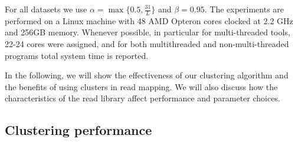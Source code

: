 \documentclass[a4paper]{article}
\begin{document}
For all datasets we use $\alpha=\max\{0.5, \frac{31}{L}\}$ and $\beta=0.95$.
The experiments are performed on a Linux machine with 48 AMD
Opteron cores clocked at 2.2 GHz and 256GB
memory. Whenever possible, in particular for multi-threaded tools, 22-24
cores were assigned, and for both multithreaded and non-multi-threaded
programs total system time is reported.

In the following,
we will show the effectiveness
of our clustering algorithm and the benefits of using clusters
in read mapping. We will also discuss how the characteristics
of the read library affect performance and parameter choices.

\subsection{Clustering performance}
\end{document}
